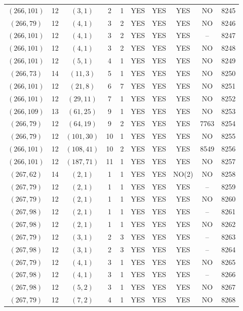 \begin{longtable}{|c|c|c|c|c|c|c|c|c|c|}
$(266, 101)$ & 12 & $(3, 1)$ & 2 & 1 & YES & YES & YES & NO & 8245\\
$(266, 79)$ & 12 & $(4, 1)$ & 3 & 2 & YES & YES & YES & NO & 8246\\
$(266, 101)$ & 12 & $(4, 1)$ & 3 & 2 & YES & YES & YES & -- & 8247\\
$(266, 101)$ & 12 & $(4, 1)$ & 3 & 2 & YES & YES & YES & NO & 8248\\
$(266, 101)$ & 12 & $(5, 1)$ & 4 & 1 & YES & YES & YES & NO & 8249\\
$(266, 73)$ & 14 & $(11, 3)$ & 5 & 1 & YES & YES & YES & NO & 8250\\
$(266, 101)$ & 12 & $(21, 8)$ & 6 & 7 & YES & YES & YES & NO & 8251\\
$(266, 101)$ & 12 & $(29, 11)$ & 7 & 1 & YES & YES & YES & NO & 8252\\
$(266, 109)$ & 13 & $(61, 25)$ & 9 & 1 & YES & YES & YES & NO & 8253\\
$(266, 79)$ & 12 & $(64, 19)$ & 9 & 2 & YES & YES & YES & 7763 & 8254\\
$(266, 79)$ & 12 & $(101, 30)$ & 10 & 1 & YES & YES & YES & NO & 8255\\
$(266, 101)$ & 12 & $(108, 41)$ & 10 & 2 & YES & YES & YES & 8549 & 8256\\
$(266, 101)$ & 12 & $(187, 71)$ & 11 & 1 & YES & YES & YES & NO & 8257\\
$(267, 62)$ & 14 & $(2, 1)$ & 1 & 1 & YES & YES & NO(2) & NO & 8258\\
$(267, 79)$ & 12 & $(2, 1)$ & 1 & 1 & YES & YES & YES & -- & 8259\\
$(267, 79)$ & 12 & $(2, 1)$ & 1 & 1 & YES & YES & YES & NO & 8260\\
$(267, 98)$ & 12 & $(2, 1)$ & 1 & 1 & YES & YES & YES & -- & 8261\\
$(267, 98)$ & 12 & $(2, 1)$ & 1 & 1 & YES & YES & YES & NO & 8262\\
$(267, 79)$ & 12 & $(3, 1)$ & 2 & 3 & YES & YES & YES & -- & 8263\\
$(267, 98)$ & 12 & $(3, 1)$ & 2 & 3 & YES & YES & YES & -- & 8264\\
$(267, 79)$ & 12 & $(4, 1)$ & 3 & 1 & YES & YES & YES & NO & 8265\\
$(267, 98)$ & 12 & $(4, 1)$ & 3 & 1 & YES & YES & YES & -- & 8266\\
$(267, 98)$ & 12 & $(5, 2)$ & 3 & 1 & YES & YES & YES & NO & 8267\\
$(267, 79)$ & 12 & $(7, 2)$ & 4 & 1 & YES & YES & YES & NO & 8268\\

\end{longtable}
